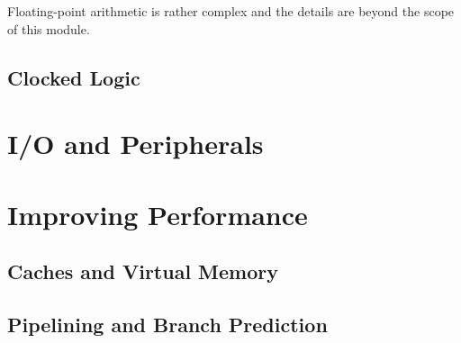 \documentclass{article}
\begin{document}
	Floating-point arithmetic is rather complex and the details are beyond the scope of this module.
	
	\subsection{Clocked Logic}
	
	\section{I/O and Peripherals}
	
	\section{Improving Performance}
	\subsection{Caches and Virtual Memory}
	\subsection{Pipelining and Branch Prediction}
	
	\newpage
	\listoffigures
	\printindex	
\end{document}
